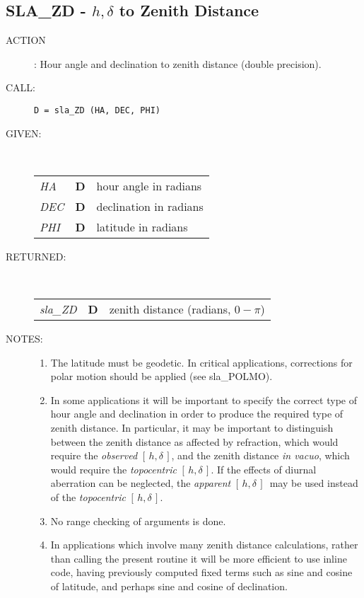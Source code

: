 \documentclass[11pt,twoside]{article}
\newcommand{\xlabel}[1]{}
\newcommand{\hadec}     {$[\,h,\delta\,]$}
\newcommand{\routine}[3]
{\hbadness=10000
  \vbox
  {
    \rule{\textwidth}{0.3mm}\\
    {\Large {\bf #1} \hfill #2 \hfill {\bf #1}}\\
    \setlength{\oldspacing}{\topsep}
    \setlength{\topsep}{0.3ex}
    \begin{description}
      #3
    \end{description}
    \setlength{\topsep}{\oldspacing}
  }
}
\renewcommand{\routine}[3]
   {
      \subsection{#1\xlabel{#1} - #2\label{#1}}
       \begin{description}
         #3
       \end{description}
   }
\newcommand{\action}[1]
{\item[ACTION]: #1}
\newcommand{\action}[1]
   {\item[ACTION:] #1}
\newcommand{\call}[1]
{\item[CALL]: \hspace{0.4em}{\tt #1}}
\newlength{\oldspacing}
\renewcommand{\call}[1]
   {
    \item[CALL:] {\tt #1}
   }
\newcommand{\args}[2]
{
  \goodbreak
  \setlength{\oldspacing}{\topsep}
  \setlength{\topsep}{0.3ex}
  \begin{description}
  \item[#1]:\\[1.5ex]
    \begin{tabular}{p{7em}p{6em}p{22em}}
      #2
    \end{tabular}
  \end{description}
  \setlength{\topsep}{\oldspacing}
}
\renewcommand{\args}[2]
   {
     \begin{description}
        \item[#1:]\\
        \begin{tabular}{p{7em}p{6em}l}
           #2
        \end{tabular}
     \end{description}
   }
\newcommand{\spec}[3]
{
  {\em {#1}} & {\bf \mbox{#2}} & {#3}
}
\newcommand{\notes}[1]
{
  \goodbreak
  \setlength{\oldspacing}{\topsep}
  \setlength{\topsep}{0.3ex}
  \begin{description}
    \item[NOTES]:
        #1
  \end{description}
  \setlength{\topsep}{\oldspacing}
}
\renewcommand{\notes}[1]
   {
      \begin{description}
         \item[NOTES:]
            #1
      \end{description}
   }
\begin{document}
\routine{SLA\_ZD}{$h,\delta$ to Zenith Distance}
{
 \action{Hour angle and declination to zenith distance
         (double precision).}
 \call{D~=~sla\_ZD (HA, DEC, PHI)}
}
\args{GIVEN}
{
 \spec{HA}{D}{hour angle in radians} \\
 \spec{DEC}{D}{declination in radians} \\
 \spec{PHI}{D}{latitude in radians}
}
\args{RETURNED}
{
 \spec{sla\_ZD}{D}{zenith distance (radians, $0\!-\!\pi$)}
}
\notes
{
 \begin{enumerate}
  \item The latitude must be geodetic.  In critical applications,
        corrections for polar motion should be applied (see sla\_POLMO).
  \item In some applications it will be important to specify the
        correct type of hour angle and declination in order to
        produce the required type
        of zenith distance.  In particular, it may be
        important to distinguish between the zenith distance
        as affected by refraction, which would require the
        {\it observed}\/ \hadec, and the zenith distance {\it in vacuo},
        which would require the {\it topocentric}\/ \hadec.  If
        the effects of diurnal aberration can be neglected, the
        {\it apparent}\/ \hadec\ may be used instead of the
        {\it topocentric}\/ \hadec.
  \item No range checking of arguments is done.
  \item In applications which involve many zenith distance calculations,
        rather than calling the present routine it will be more
        efficient to use inline code, having previously computed fixed
        terms such as sine and cosine of latitude, and perhaps sine and
        cosine of declination.
 \end{enumerate}
}
\vfill
\pagebreak
\end{document}
